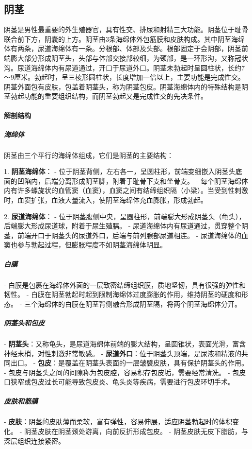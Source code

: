 \subsection{阴茎}

阴茎是男性最重要的外生殖器官，具有性交、排尿和射精三大功能。阴茎位于耻骨联合前下方，阴囊的上方。阴茎由3条海绵体外包筋膜和皮肤构成。其中阴茎海绵体有两条，尿道海绵体有一条。分根部、体部及头部。根部固定于会阴部，阴茎前端膨大部分形成阴茎头，头部与体部交接部较细，为颈部，是一环形沟，又称冠状沟。尿道海绵体内有尿道通过，开口于尿道外口。阴茎未勃起时呈圆柱状，长约7～9厘米。勃起时，呈三棱形圆柱状，长度增加一倍以上，主要功能是完成性交。阴茎外面包有皮肤，包盖着阴茎头，称为阴茎包皮。阴茎海绵体内的特殊结构是阴茎勃起功能的重要组织结构，而阴茎勃起又是完成性交的先决条件。

\paragraph{解剖结构}

\subparagraph{海绵体}
阴茎由三个平行的海绵体组成，它们是阴茎的主要结构：

1. \textbf{阴茎海绵体}：
   - 位于阴茎背侧，左右各一，呈圆柱形，前端变细嵌入阴茎头底面的凹陷内，后端分离形成阴茎脚，附着于耻骨下支和坐骨支。
   - 每个阴茎海绵体内有许多螺旋状的血管窦（血窦），血窦之间有结缔组织隔（小梁）。当受到性刺激时，血窦扩张，血液大量流入，使阴茎海绵体充血膨胀，形成勃起。

2. \textbf{尿道海绵体}：
   - 位于阴茎腹侧中央，呈圆柱形，前端膨大形成阴茎头（龟头），后端膨大形成尿道球，附着于尿生殖膈。
   - 尿道海绵体内有尿道通过，贯穿整个阴茎，前端开口于阴茎头的尿道外口，后端与前列腺部尿道相连。
   - 尿道海绵体的血窦也参与勃起过程，但膨胀程度不如阴茎海绵体明显。

\subparagraph{白膜}
- 白膜是包裹在海绵体外面的一层致密结缔组织膜，质地坚韧，具有很强的弹性和韧性。
- 白膜在阴茎勃起时起到限制海绵体过度膨胀的作用，维持阴茎的硬度和形态。
- 三个海绵体的白膜在阴茎背侧融合形成阴茎隔，将两个阴茎海绵体分开。

\subparagraph{阴茎头和包皮}
- \textbf{阴茎头}：又称龟头，是尿道海绵体前端的膨大结构，呈圆锥状，表面光滑，富含神经末梢，对性刺激非常敏感。
- \textbf{尿道外口}：位于阴茎头顶端，是尿液和精液的共同出口。
- \textbf{包皮}：是覆盖在阴茎头表面的一层皱襞皮肤，具有保护阴茎头的作用。
  - 包皮与阴茎头之间的间隙称为包皮腔，容易积存包皮垢，需要经常清洗。
  - 包皮口狭窄或包皮过长可能导致包皮炎、龟头炎等疾病，需要进行包皮环切手术。

\subparagraph{皮肤和筋膜}
- \textbf{皮肤}：阴茎的皮肤薄而柔软，富有弹性，容易伸展，适应阴茎勃起时的体积变化。
  - 阴茎皮肤在阴茎颈处游离，向前反折形成包皮。
  - 阴茎皮肤无皮下脂肪，与深层组织连接紧密。

